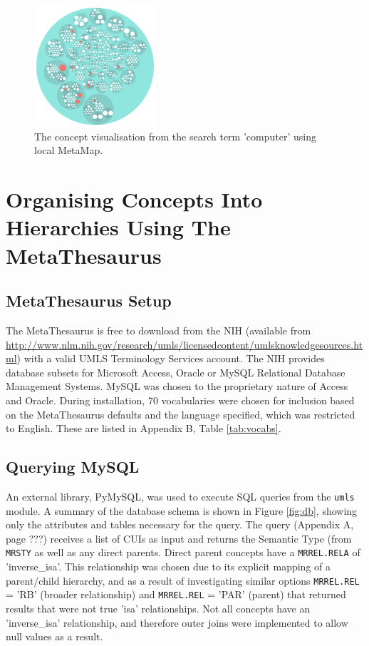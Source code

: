 \documentclass[Report.tex]{subfiles}
\begin{document}
\begin{figure}[h!]
\begin{center}
\includegraphics[width=0.4\textwidth]{../lib/images/mm-screen.png}
\caption{The concept visualisation from the search term 'computer' using local MetaMap.}
\label{fig:mm-screen}
\end{center}
\end{figure}\newpage

\section{Organising Concepts Into Hierarchies Using The MetaThesaurus}
\subsection{MetaThesaurus Setup}
The MetaThesaurus is free to download from the NIH (available from \url{http://www.nlm.nih.gov/research/umls/licensedcontent/umlsknowledgesources.html}) with a valid UMLS Terminology Services account. The NIH provides database subsets for Microsoft Access, Oracle or MySQL Relational Database Management Systems. MySQL was chosen to the proprietary nature of Access and Oracle. During installation, 70 vocabularies were chosen for inclusion based on the MetaThesaurus defaults and the language specified, which was restricted to English. These are listed in Appendix B, Table \ref{tab:vocabs}. 

\subsection{Querying MySQL}
An external library, PyMySQL, was used to execute SQL queries from the \texttt{umls} module. A summary of the database schema is shown in Figure \ref{fig:db}, showing only the attributes and tables necessary for the query. The query (Appendix A, page ???) receives a list of CUIs as input and returns the Semantic Type (from \texttt{MRSTY} as well as any direct parents. Direct parent concepts have a \texttt{MRREL.RELA} of 'inverse\_isa'. This relationship was chosen due to its explicit mapping of a parent/child hierarchy, and as a result of investigating similar options \texttt{MRREL.REL} = 'RB' (broader relationship) and \texttt{MRREL.REL} = 'PAR' (parent) that returned results that were not true 'isa' relationships. Not all concepts have an 'inverse\_isa' relationship, and therefore outer joins were implemented to allow null values as a result.\newline
\end{document}
